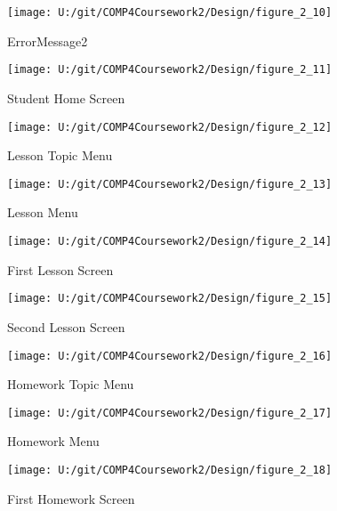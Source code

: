 \begin{figure}[H]
    \label{fig:print_function_result}\caption{ErrorMessage2}
    \texttt{[image: U:/git/COMP4Coursework2/Design/figure\_2\_10]}
\end{figure}

\begin{figure}[H]
    \label{fig:print_function_result}\caption{Student Home Screen}
    \texttt{[image: U:/git/COMP4Coursework2/Design/figure\_2\_11]}
\end{figure}

\begin{figure}[H]
    \label{fig:print_function_result}\caption{Lesson Topic Menu}
    \texttt{[image: U:/git/COMP4Coursework2/Design/figure\_2\_12]}
\end{figure}

\begin{figure}[H]
    \label{fig:print_function_result}\caption{Lesson Menu}
    \texttt{[image: U:/git/COMP4Coursework2/Design/figure\_2\_13]}
\end{figure}

\begin{figure}[H]
    \label{fig:print_function_result}\caption{First Lesson Screen}
    \texttt{[image: U:/git/COMP4Coursework2/Design/figure\_2\_14]}
\end{figure}

\begin{figure}[H]
    \label{fig:print_function_result}\caption{Second Lesson Screen}
    \texttt{[image: U:/git/COMP4Coursework2/Design/figure\_2\_15]}
\end{figure}

\begin{figure}[H]
    \label{fig:print_function_result}\caption{Homework Topic Menu}
    \texttt{[image: U:/git/COMP4Coursework2/Design/figure\_2\_16]}
\end{figure}

\begin{figure}[H]
    \label{fig:print_function_result}\caption{Homework Menu}
    \texttt{[image: U:/git/COMP4Coursework2/Design/figure\_2\_17]}
\end{figure}

\begin{figure}[H]
    \label{fig:print_function_result}\caption{First Homework Screen}
    \texttt{[image: U:/git/COMP4Coursework2/Design/figure\_2\_18]}
\end{figure}

